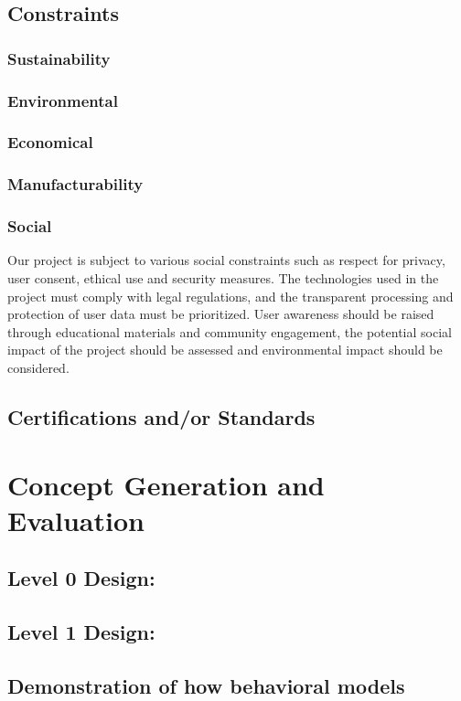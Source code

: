 \documentclass[12pt]{article}
\begin{document}
	\subsection{Constraints}
		\subsubsection{Sustainability}
		\subsubsection{Environmental}
		\subsubsection{Economical}
		\subsubsection{Manufacturability}
		\subsubsection{Social}
  		Our project is subject to various social constraints such as respect for privacy, user consent, ethical use and security measures. The technologies used in the project must comply with legal regulations, and the transparent processing and protection of user data must be prioritized. User awareness should be raised through educational materials and community engagement, the potential social impact of the project should be assessed and environmental impact should be considered.
	\subsection{Certifications and/or Standards}
	
	\section{Concept Generation and Evaluation}
	
	\subsection{Level 0 Design:}
	
	\subsection{Level 1 Design:}
	
	\subsection{Demonstration of how behavioral models}
\end{document}
